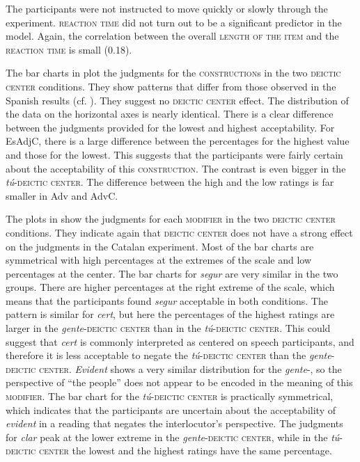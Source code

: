 The participants were not instructed to move quickly or slowly through the experiment.  \textsc{reaction time} did not turn out to be a significant predictor in the model. Again, the correlation between the overall \textsc{length of the item} and the \textsc{reaction time} is small (0.18).\largerpage

The bar charts in  plot the judgments for the \textsc{construction}s in the two \textsc{deictic center} conditions. They show  patterns that differ from those observed in the Spanish results (cf.  ). They   suggest no  \textsc{deictic center} effect. The distribution of the data on the horizontal axes is nearly identical. There is a clear difference between the judgments provided for the lowest and highest acceptability. For EsAdjC, there is a large difference between the percentages for  the highest value and those for the lowest. This suggests that the participants were fairly certain about the acceptability of this \textsc{construction}. The contrast is even bigger in the \textit{tú}-\textsc{deictic center}. The difference between the high and the low ratings is far smaller in Adv and AdvC. 

The plots in  show the judgments for each \textsc{modifier} in the two \textsc{deictic center} conditions. They  indicate again that \textsc{deictic center} does not have a strong effect on the judgments in the Catalan experiment. Most of the bar charts are symmetrical with high percentages at the extremes of the scale and low percentages at the center. The bar charts for \textit{segur} are very similar in the two groups. There are higher percentages at the right extreme of the scale, which means that the participants found \textit{segur} acceptable in both conditions. The pattern is similar for \textit{cert}, but here the percentages of the highest ratings are larger in the \textit{gente}-\textsc{deictic center} than in the \textit{tú}-\textsc{deictic center}. This could suggest that \textit{cert} is commonly interpreted as centered on speech participants, and therefore it is less acceptable to negate the \textit{tú}-\textsc{deictic center} than the \textit{gente}-\textsc{deictic center}. \textit{Evident} shows a very similar distribution for the \textit{gente}-\textsc{}, so the perspective of ``the people'' does not appear to be encoded in the meaning of this \textsc{modifier}. The bar chart for the \textit{tú}-\textsc{deictic center} is practically symmetrical, which indicates that the participants are uncertain about the acceptability of \textit{evident} in a reading that negates the interlocutor's perspective.  The judgments for \textit{clar} peak at the lower extreme in the \textit{gente}-\textsc{deictic center}, while in the \textit{tú}-\textsc{deictic center} the lowest and the highest ratings have the same percentage. 


